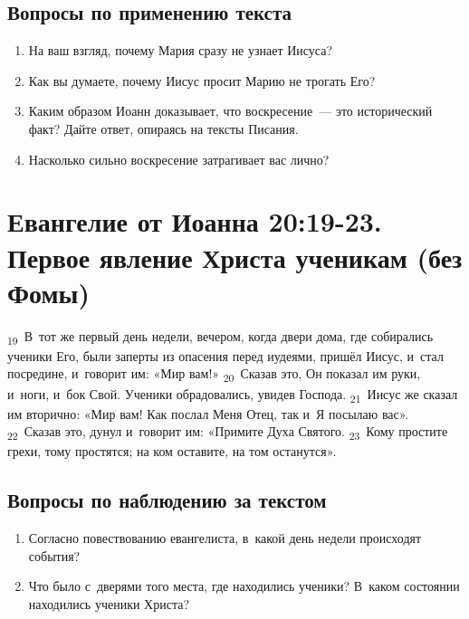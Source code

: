 \documentclass[a4paper,12pt]{article}
\begin{document}
\subsection*{Вопросы по применению текста} 
\begin{enumerate}
    \item На ваш взгляд, почему Мария сразу не узнает Иисуса? 
    
    \myline
    
    \myline
    \item Как вы думаете, почему Иисус просит Марию не трогать Его? 
    
    \myline
    
    \myline
    \item Каким образом Иоанн доказывает, что воскресение~--- это исторический факт? Дайте ответ, опираясь на тексты Писания. 
    
    \myline
    
    \myline
    \item Насколько сильно воскресение затрагивает вас лично? 
    
    \myline
    
    \myline
\end{enumerate}



\section{Евангелие от Иоанна 20:19-23. Первое явление Христа ученикам (без Фомы)}

\textsubscript{19}~В~тот же первый день недели, вечером, когда двери дома, где собирались ученики Его, были заперты из опасения перед иудеями, пришёл Иисус, и~стал посредине, и~говорит им: «Мир вам!» \textsubscript{20}~Сказав это, Он показал им руки, и~ноги, и~бок Свой. Ученики обрадовались, увидев Господа. \textsubscript{21}~Иисус же сказал им вторично: «Мир вам! Как послал Меня Отец, так и~Я посылаю вас». \textsubscript{22}~Сказав это, дунул и~говорит им: «Примите Духа Святого. \textsubscript{23}~Кому простите грехи, тому простятся; на ком оставите, на том останутся». 

\subsection*{Вопросы по наблюдению за текстом}
\begin{enumerate}
    \item Согласно повествованию евангелиста, в~какой день недели происходят события? 
    
    \myline
    
    \myline
    \item Что было с~дверями того места, где находились ученики? В~каком состоянии находились ученики Христа? 
    
    \myline
    
    \myline
\end{enumerate}
\end{document}
